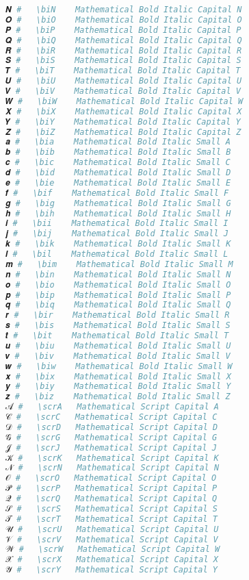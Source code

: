 \begin{lstlisting}[language=Julia]
𝑵 #   \biN    Mathematical Bold Italic Capital N
𝑶 #   \biO    Mathematical Bold Italic Capital O
𝑷 #   \biP    Mathematical Bold Italic Capital P
𝑸 #   \biQ    Mathematical Bold Italic Capital Q
𝑹 #   \biR    Mathematical Bold Italic Capital R
𝑺 #   \biS    Mathematical Bold Italic Capital S
𝑻 #   \biT    Mathematical Bold Italic Capital T
𝑼 #   \biU    Mathematical Bold Italic Capital U
𝑽 #   \biV    Mathematical Bold Italic Capital V
𝑾 #   \biW    Mathematical Bold Italic Capital W
𝑿 #   \biX    Mathematical Bold Italic Capital X
𝒀 #   \biY    Mathematical Bold Italic Capital Y
𝒁 #   \biZ    Mathematical Bold Italic Capital Z
𝒂 #   \bia    Mathematical Bold Italic Small A
𝒃 #   \bib    Mathematical Bold Italic Small B
𝒄 #   \bic    Mathematical Bold Italic Small C
𝒅 #   \bid    Mathematical Bold Italic Small D
𝒆 #   \bie    Mathematical Bold Italic Small E
𝒇 #   \bif    Mathematical Bold Italic Small F
𝒈 #   \big    Mathematical Bold Italic Small G
𝒉 #   \bih    Mathematical Bold Italic Small H
𝒊 #   \bii    Mathematical Bold Italic Small I
𝒋 #   \bij    Mathematical Bold Italic Small J
𝒌 #   \bik    Mathematical Bold Italic Small K
𝒍 #   \bil    Mathematical Bold Italic Small L
𝒎 #   \bim    Mathematical Bold Italic Small M
𝒏 #   \bin    Mathematical Bold Italic Small N
𝒐 #   \bio    Mathematical Bold Italic Small O
𝒑 #   \bip    Mathematical Bold Italic Small P
𝒒 #   \biq    Mathematical Bold Italic Small Q
𝒓 #   \bir    Mathematical Bold Italic Small R
𝒔 #   \bis    Mathematical Bold Italic Small S
𝒕 #   \bit    Mathematical Bold Italic Small T
𝒖 #   \biu    Mathematical Bold Italic Small U
𝒗 #   \biv    Mathematical Bold Italic Small V
𝒘 #   \biw    Mathematical Bold Italic Small W
𝒙 #   \bix    Mathematical Bold Italic Small X
𝒚 #   \biy    Mathematical Bold Italic Small Y
𝒛 #   \biz    Mathematical Bold Italic Small Z
𝒜 #   \scrA   Mathematical Script Capital A
𝒞 #   \scrC   Mathematical Script Capital C
𝒟 #   \scrD   Mathematical Script Capital D
𝒢 #   \scrG   Mathematical Script Capital G
𝒥 #   \scrJ   Mathematical Script Capital J
𝒦 #   \scrK   Mathematical Script Capital K
𝒩 #   \scrN   Mathematical Script Capital N
𝒪 #   \scrO   Mathematical Script Capital O
𝒫 #   \scrP   Mathematical Script Capital P
𝒬 #   \scrQ   Mathematical Script Capital Q
𝒮 #   \scrS   Mathematical Script Capital S
𝒯 #   \scrT   Mathematical Script Capital T
𝒰 #   \scrU   Mathematical Script Capital U
𝒱 #   \scrV   Mathematical Script Capital V
𝒲 #   \scrW   Mathematical Script Capital W
𝒳 #   \scrX   Mathematical Script Capital X
𝒴 #   \scrY   Mathematical Script Capital Y

\end{lstlisting}
